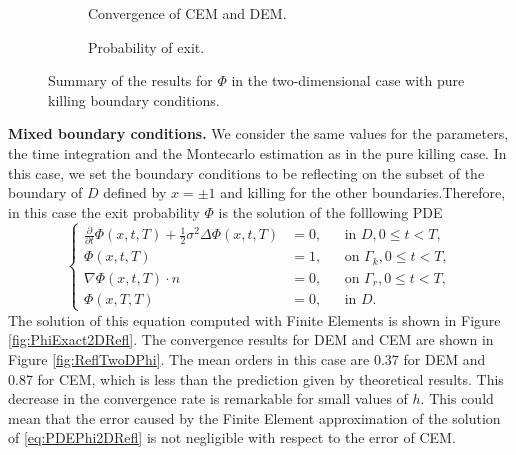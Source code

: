 \begin{figure}[t]
    \centering
    \begin{subfigure}{0.49\linewidth}
        \centering
        \resizebox{1\linewidth}{!}{ }  
        \caption{Convergence of CEM and DEM.}
        \label{fig:KillTwoDPhi}
    \end{subfigure}
    \begin{subfigure}{0.49\linewidth}
        \centering
        \resizebox{1\linewidth}{!}{ }  
        \caption{Probability of exit.}
        \label{fig:PhiExact2DKill}
    \end{subfigure}    
    \caption{Summary of the results for $\Phi$ in the two-dimensional case with pure killing boundary conditions.}
    \label{fig:OrdersTwoDKillPhi}
\end{figure}
\vspace{2mm}
\noindent\textbf{Mixed boundary conditions.} We consider the same values for the parameters, the time integration and the Montecarlo estimation as in the pure killing case. In this case, we set the boundary conditions to be reflecting on the subset of the boundary of $D$ defined by $x = \pm 1$ and killing for the other boundaries.Therefore, in this case the exit probability $\Phi$ is the solution of the folllowing PDE
\begin{equation}\label{eq:PDEPhi2DRefl}
	\left \{
  	\begin{aligned}
	\frac{\partial}{\partial t} \Phi(x,t,T) + \frac{1}{2} \sigma^2 \Delta \Phi(x,t,T) &= 0, && \text{in } D, 0 \leq t < T,\\
	\Phi(x,t,T) &= 1, && \text{on } \Gamma_k, 0 \leq t < T,\\
	\nabla \Phi(x,t,T) \cdot n &= 0, && \text{on } \Gamma_r, 0 \leq t < T,\\
	\Phi(x,T,T) &= 0, && \text{in } D.
  	\end{aligned} \right.
\end{equation}
The solution of this equation computed with Finite Elements is shown in Figure \ref{fig:PhiExact2DRefl}. The convergence results for DEM and CEM are shown in Figure \ref{fig:ReflTwoDPhi}. The mean orders in this case are 0.37 for DEM and 0.87 for CEM, which is less than the prediction given by theoretical results. This decrease in the convergence rate is remarkable for small values of $h$. This could mean that the error caused by the Finite Element approximation of the solution of \eqref{eq:PDEPhi2DRefl} is not negligible with respect to the error of CEM.
